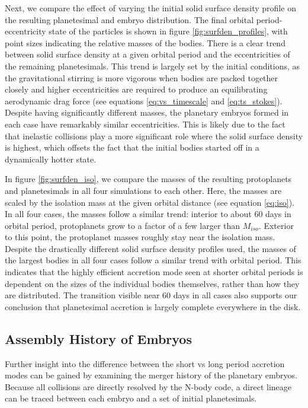 \documentclass[twocolumn]{aastex63}
\begin{document}
Next, we compare the effect of varying the initial solid surface density profile on the resulting planetesimal and embryo distribution. The final orbital period-eccentricity state of the particles is shown in figure \ref{fig:surfden_profiles}, with point sizes indicating the relative masses of the bodies. There is a clear trend between solid surface density at a given orbital period and the eccentricities of the remaining planetesimals. This trend is largely set by the initial conditions, as the gravitational stirring is more vigorous when bodies are packed together closely and higher eccentricities are required to produce an equilibrating aerodynamic drag force (see equations \ref{eq:vs_timescale} and \ref{eq:ts_stokes}). Despite having significantly different masses, the planetary embryos formed in each case have remarkably similar eccentricities. This is likely due to the fact that inelastic collisions play a more significant role where the solid surface density is highest, which offsets the fact that the initial bodies started off in a dynamically hotter state.

In figure \ref{fig:surfden_iso}, we compare the masses of the resulting protoplanets and planetesimals in all four simulations to each other. Here, the masses are scaled by the isolation mass at the given orbital distance (see equation \ref{eq:iso}). In all four cases, the masses follow a similar trend: interior to about 60 days in orbital period, protoplanets grow to a factor of a few larger than $M_{iso}$. Exterior to this point, the protoplanet masses roughly stay near the isolation mass. Despite the drastically different solid surface density profiles used, the masses of the largest bodies in all four cases follow a similar trend with orbital period. This indicates that the highly efficient accretion mode seen at shorter orbital periods is dependent on the sizes of the individual bodies themselves, rather than how they are distributed. The transition visible near 60 days in all cases also supports our conclusion that planetesimal accretion is largely complete everywhere in the disk.

\subsection{Assembly History of Embryos}\label{sec:assembly}

Further insight into the difference between the short vs long period accretion modes can be gained by examining the merger history of the planetary embryos. Because all collisions are directly resolved by the N-body code, a direct lineage can be traced between each embryo and a set of initial planetesimals.
\end{document}
